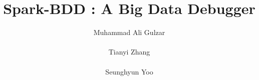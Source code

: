 \documentclass{acm_proc_article-sp}
\begin{document}
\title{ {\ttlit Spark-BDD} :  A Big Data Debugger}

%
%
%
%
%

%
\author{
%
%
\alignauthor Muhammad Ali Gulzar\\
       \\
\alignauthor Tianyi Zhang\\
       \\
\alignauthor Seunghyun Yoo\\
}
\end{document}
